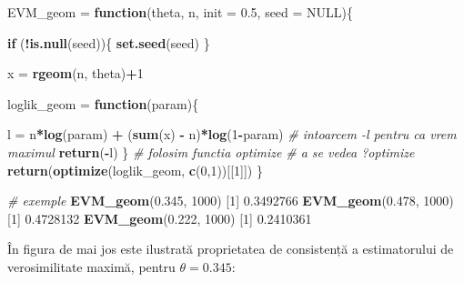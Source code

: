 \documentclass[]{article}
\newenvironment{Shaded}{\begin{snugshade}}{\end{snugshade}}
\newcommand{\KeywordTok}[1]{\textcolor[rgb]{0.13,0.29,0.53}{\textbf{#1}}}
\newcommand{\DataTypeTok}[1]{\textcolor[rgb]{0.13,0.29,0.53}{#1}}
\newcommand{\DecValTok}[1]{\textcolor[rgb]{0.00,0.00,0.81}{#1}}
\newcommand{\FloatTok}[1]{\textcolor[rgb]{0.00,0.00,0.81}{#1}}
\newcommand{\StringTok}[1]{\textcolor[rgb]{0.31,0.60,0.02}{#1}}
\newcommand{\CommentTok}[1]{\textcolor[rgb]{0.56,0.35,0.01}{\textit{#1}}}
\newcommand{\OtherTok}[1]{\textcolor[rgb]{0.56,0.35,0.01}{#1}}
\newcommand{\ControlFlowTok}[1]{\textcolor[rgb]{0.13,0.29,0.53}{\textbf{#1}}}
\newcommand{\OperatorTok}[1]{\textcolor[rgb]{0.81,0.36,0.00}{\textbf{#1}}}
\newcommand{\NormalTok}[1]{#1}
\begin{document}
\begin{Shaded}
\begin{Highlighting}[]
\NormalTok{EVM_geom =}\StringTok{ }\ControlFlowTok{function}\NormalTok{(theta, n, }\DataTypeTok{init =} \FloatTok{0.5}\NormalTok{, }\DataTypeTok{seed =} \OtherTok{NULL}\NormalTok{)\{}
  
  \ControlFlowTok{if}\NormalTok{ (}\OperatorTok{!}\KeywordTok{is.null}\NormalTok{(seed))\{}
    \KeywordTok{set.seed}\NormalTok{(seed)}
\NormalTok{  \}}
  
\NormalTok{  x =}\StringTok{ }\KeywordTok{rgeom}\NormalTok{(n, theta)}\OperatorTok{+}\DecValTok{1}
  
\NormalTok{  loglik_geom =}\StringTok{ }\ControlFlowTok{function}\NormalTok{(param)\{}
    
\NormalTok{    l =}\StringTok{ }\NormalTok{n}\OperatorTok{*}\KeywordTok{log}\NormalTok{(param) }\OperatorTok{+}\StringTok{ }\NormalTok{(}\KeywordTok{sum}\NormalTok{(x) }\OperatorTok{-}\StringTok{ }\NormalTok{n)}\OperatorTok{*}\KeywordTok{log}\NormalTok{(}\DecValTok{1}\OperatorTok{-}\NormalTok{param)}
    \CommentTok{# intoarcem -l pentru ca vrem maximul}
    \KeywordTok{return}\NormalTok{(}\OperatorTok{-}\NormalTok{l)}
\NormalTok{  \}}
  \CommentTok{# folosim functia optimize}
  \CommentTok{# a se vedea ?optimize}
  \KeywordTok{return}\NormalTok{(}\KeywordTok{optimize}\NormalTok{(loglik_geom, }\KeywordTok{c}\NormalTok{(}\DecValTok{0}\NormalTok{,}\DecValTok{1}\NormalTok{))[[}\DecValTok{1}\NormalTok{]])}
\NormalTok{\}}

\CommentTok{# exemple}
\KeywordTok{EVM_geom}\NormalTok{(}\FloatTok{0.345}\NormalTok{, }\DecValTok{1000}\NormalTok{)}
\NormalTok{[}\DecValTok{1}\NormalTok{] }\FloatTok{0.3492766}
\KeywordTok{EVM_geom}\NormalTok{(}\FloatTok{0.478}\NormalTok{, }\DecValTok{1000}\NormalTok{)}
\NormalTok{[}\DecValTok{1}\NormalTok{] }\FloatTok{0.4728132}
\KeywordTok{EVM_geom}\NormalTok{(}\FloatTok{0.222}\NormalTok{, }\DecValTok{1000}\NormalTok{)}
\NormalTok{[}\DecValTok{1}\NormalTok{] }\FloatTok{0.2410361}
\end{Highlighting}
\end{Shaded}

În figura de mai jos este ilustrată proprietatea de consistență a
estimatorului de verosimilitate maximă, pentru \(\theta = 0.345\):
\end{document}
